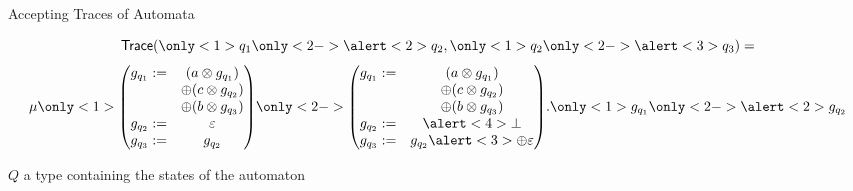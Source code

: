 \documentclass[10pt]{beamer}
\begin{document}
\begin{frame}{Accepting Traces of Automata}
    \begin{minipage}{.5\textwidth}
      \[ \mathsf{Trace}(\only<1>{q_{1}}\only<2->{\alert<2> {q_{2}}}, \only<1>{q_{2}}\only<2->{\alert<3>{q_{3}}}) = \]
      \begin{equation*}
        \mu
        \only<1>{
        \begin{pmatrix}
          g_{q_{1}} := & (a \otimes g_{q_{1}}) \\ & \oplus  ( c \otimes g_{q_{2}} ) \\ & \oplus (b \otimes g_{q_{3}}) \\
          g_{q_{2}} := & \varepsilon \\
          g_{q_{3}} := & g_{q_{2}} \\
        \end{pmatrix}}\only<2->{
        \begin{pmatrix}
          g_{q_{1}} := & (a \otimes g_{q_{1}}) \\ & \oplus  ( c \otimes g_{q_{2}} ) \\ & \oplus (b \otimes g_{q_{3}}) \\
          g_{q_{2}} := & \alert<4>{\bot} \\
          g_{q_{3}} := & g_{q_{2}} \alert<3>{\oplus \varepsilon} \\
        \end{pmatrix}
        }. \only<1>{g_{q_{1}}}\only<2->{\alert<2>{g_{q_{2}}}}
      \end{equation*}
    \end{minipage}%
    \begin{minipage}{.5\textwidth}
      $Q$ a type containing the states of the automaton


\end{minipage}
\end{frame}
\end{document}
